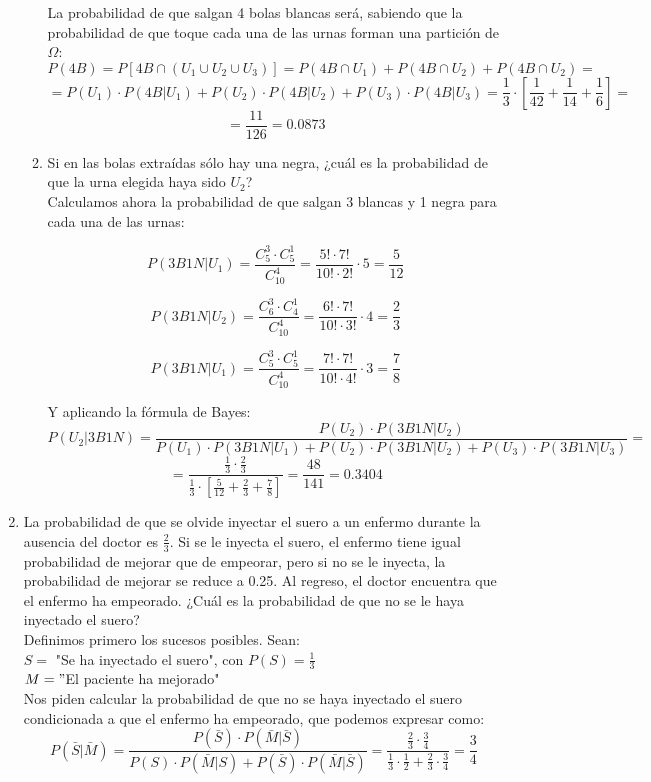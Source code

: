 \documentclass[a4paper,12pt]{article}
\begin{document}
\begin{enumerate}[label=\textbf{\arabic*.}]
\begin{enumerate}
        La probabilidad de que salgan 4 bolas blancas será, sabiendo que la probabilidad de que toque cada una de las urnas forman una partición de $\Omega$:
        $$P(4B)=P[4B \cap (U_1 \cup U_2 \cup U_3)]= P(4B \cap U_1)+P(4B \cap U_2)+P(4B \cap U_2)=$$
        $$=P(U_1) \cdot P(4B|U_1)+P(U_2) \cdot P(4B|U_2)+P(U_3) \cdot P(4B|U_3)=\frac{1}{3}\cdot[\frac{1}{42}+\frac{1}{14}+\frac{1}{6}]=$$
        $$=\frac{11}{126}=0.0873$$
        
        \item Si en las bolas extraídas sólo hay una negra, ¿cuál es la probabilidad de que la urna elegida haya sido \( U_2 \)?\\

        Calculamos ahora la probabilidad de que salgan 3 blancas y 1 negra para cada una de las urnas:
    
        $$P(3B1N|U_1)=\frac{C^3_5 \cdot C^1_5} {C^4_{10}} =\frac{5!\cdot7!}{10!\cdot 2!} \cdot 5= \frac{5}{12}$$
        
        $$P(3B1N|U_2)=\frac{C^3_6 \cdot C^1_4} {C^4_{10}} =\frac{6!\cdot7!}{10!\cdot 3!} \cdot 4= \frac{2}{3}$$
        
        $$P(3B1N|U_1)=\frac{C^3_5 \cdot C^1_5} {C^4_{10}} =\frac{7!\cdot7!}{10!\cdot 4!}\cdot 3= \frac{7}{8}$$

        Y aplicando la fórmula de Bayes:
        $$P(U_2|3B1N)=\frac{P(U_2)\cdot P(3B1N|U_2)}{P(U_1)\cdot P(3B1N|U_1)+P(U_2)\cdot P(3B1N|U_2)+P(U_3)\cdot P(3B1N|U_3)}=$$
        $$=\frac{\frac{1}{3} \cdot \frac{2}{3}}{\frac{1}{3} \cdot [\frac{5}{12}+\frac{2}{3}+\frac{7}{8}]}= \frac{48}{141}=0.3404$$
        
    \end{enumerate}
    
    \item La probabilidad de que se olvide inyectar el suero a un enfermo durante la ausencia del doctor es \( \frac{2}{3} \). Si se le inyecta el suero, el enfermo tiene igual probabilidad de mejorar que de empeorar, pero si no se le inyecta, la probabilidad de mejorar se reduce a 0.25. Al regreso, el doctor encuentra que el enfermo ha empeorado. ¿Cuál es la probabilidad de que no se le haya inyectado el suero?\\

    Definimos primero los sucesos posibles. Sean:\\
    $S=$ "Se ha inyectado el suero", con $P(S)=\frac{1}{3}$\\
    $M= "$El paciente ha mejorado"\\
    Nos piden calcular la probabilidad de que no se haya inyectado el suero condicionada a que el enfermo ha empeorado, que podemos expresar como:
    $$P(\bar S|\bar M)=\frac{P(\bar S) \cdot P(\bar M| \bar S)}{P(S) \cdot P(\bar M| S) + P(\bar S) \cdot P(\bar M| \bar S)}=\frac{\frac{2}{3} \cdot \frac{3}{4}}{\frac{1}{3} \cdot \frac{1}{2}+\frac{2}{3} \cdot \frac{3}{4}}=\frac{3}{4}$$
    

\end{enumerate}
\end{document}
